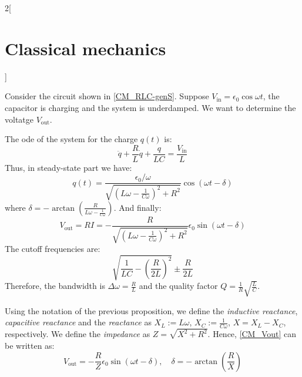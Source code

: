 \documentclass[../../../main.tex]{subfiles}
\begin{document}
\begin{multicols}{2}[\section{Classical mechanics}]
\begin{proposition}
    Consider the circuit shown in \cref{CM_RLC-genS}. Suppose $V_\text{in}=\epsilon_0\cos\omega t$, the capacitor is charging and the system is underdamped. We want to determine the voltatge $V_\text{out}$.
    \begin{center}
      \begin{minipage}{\linewidth}
        \centering
        
        \label{CM_RLC-genS}
      \end{minipage}
    \end{center}
    The ode of the system for the charge $q(t)$ is: $$\ddot{q}+\frac{R}{L}\dot{q}+\frac{q}{LC}=\frac{V_\text{in}}{L}$$ Thus, in steady-state part we have: $$q(t)=\frac{\epsilon_0/\omega}{\sqrt{{\left(L\omega-\frac{1}{C\omega}\right)}^2+R^2}}\cos(\omega t-\delta)$$ where $\delta=-\arctan\left(\frac{R}{L\omega-\frac{1}{C\omega}}\right)$.
    And finally:
    \begin{equation}\label{CM_Vout}
      V_\text{out}=RI=-\frac{R}{\sqrt{{\left(L\omega-\frac{1}{C\omega}\right)}^2+R^2}}\epsilon_0\sin(\omega t-\delta)
    \end{equation}
    The cutoff frequencies are: $$\sqrt{\frac{1}{LC}-{\left(\frac{R}{2L}\right)}^2}\pm\frac{R}{2L}$$
    Therefore, the bandwidth is $\Delta\omega=\frac{R}{L}$ and the quality factor $Q=\frac{1}{R}\sqrt{\frac{L}{C}}$.
  \end{proposition}
  \begin{definition}
    Using the notation of the previous proposition, we define the \emph{inductive reactance}, \emph{capacitive reactance} and the \emph{reactance} as $X_L:=L\omega$, $X_C:=\frac{1}{C\omega}$, $X=X_L-X_C$, respectively. We define the \emph{impedance} as $Z=\sqrt{X^2+R^2}$. Hence, \cref{CM_Vout} can be written as: $$V_\text{out}=-\frac{R}{Z}\epsilon_0\sin(\omega t-\delta),\quad\delta=-\arctan\left(\frac{R}{X}\right)$$
  \end{definition}

\end{multicols}
\end{document}

